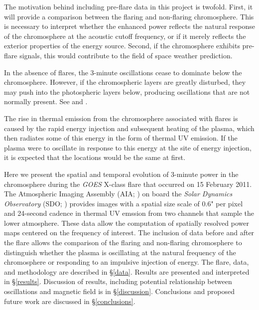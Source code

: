 The motivation behind including pre-flare data in this project
is twofold.
First, it will provide a comparison between the flaring and non-flaring
chromosphere.
This is necessary to interpret whether
the enhanced power reflects the natural response of the chromosphere
at the acoustic cutoff frequency,
or if it merely reflects the
exterior properties of the energy source.
Second, if the chromosphere exhibits pre-flare signals,
this would contribute to the field of space weather prediction.

In the absence of flares,
the 3-minute oscillations cease to dominate below the chromosphere.
However, if the chromospheric layers are greatly disturbed, they may
push into the photospheric layers below, producing oscillations that are
not normally present.
See \cite{Simoes2018} and \cite{Tripathy2018}.

The rise in thermal emission from the chromosphere associated with flares
is caused by the rapid energy injection and subsequent heating of the plasma,
which then radiates some of this energy in the form of thermal UV emission.
If the plasma were to oscillate in response to this energy at the site
of energy injection, it is expected that the locations would be the same
at first.

Here we present the spatial and temporal evolution of 3-minute power in the
chromosphere during the
\textit{GOES} X-class flare that occurred on 15 February 2011.
The Atmospheric Imaging Assembly (AIA; \cite{Lemen2012}) on board the
\textit{Solar Dynamics Observatory} (SDO; \cite{Pesnell2012})
provides images
with a spatial size scale of 0.6" per pixel and 24-second cadence
in thermal UV emssion from
two channels that sample the lower atmosphere.
These data allow the computation of spatially resolved power maps centered
on the frequency of interest.
The inclusion of data before and after the flare allows the comparison
of the flaring and non-flaring chromosphere
to distinguish whether the
plasma is oscillating at the natural frequency of the chromosphere
or responding to an impulsive injection of energy.
The flare, data, and methodology are described in \S\ref{data}.
Results are presented and interpreted in \S\ref{results}.
Discussion of results, including potential relationship between
oscillations and magnetic field is in \S\ref{discussion}.
Conclusions and proposed future work are discussed in
\S\ref{conclusions}.
